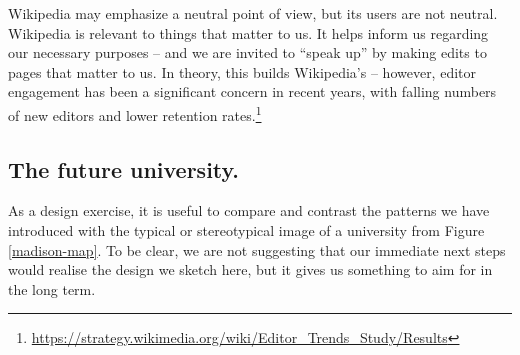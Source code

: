 %
%
Wikipedia may emphasize a neutral point of view, but its users are not
neutral.
%
%
%
Wikipedia is relevant to things that matter to us.  It helps inform us
regarding our necessary purposes -- and we are invited to ``speak up''
by making edits to pages that matter to us.  In theory, this builds
Wikipedia's  -- however, editor
engagement has been a significant concern in recent years, with
falling numbers of new editors and lower retention
rates.\footnote{\url{https://strategy.wikimedia.org/wiki/Editor_Trends_Study/Results}}
%



\subsection{The future university.}
As a design exercise, it is useful to compare and contrast the
patterns we have introduced with the typical or stereotypical image of
a university from Figure \ref{madison-map}.  To be clear, we are not
suggesting that our immediate next steps would realise the design we
sketch here, but it gives us something to aim for in the long term.

